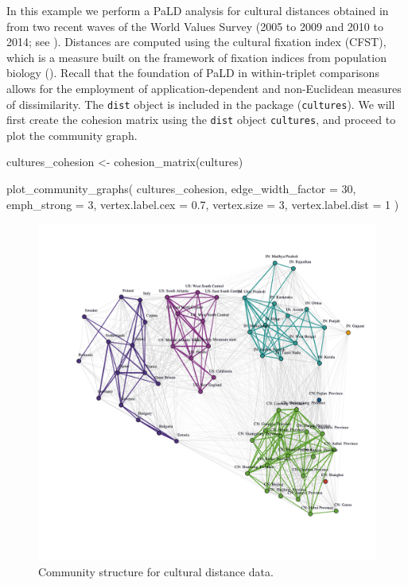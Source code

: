 In this example we perform a PaLD analysis for cultural distances
obtained in \citet{muthukrishna2020beyond} from two recent waves of the
World Values Survey (2005 to 2009 and 2010 to 2014; see
\citet{inglehart2014world}). Distances are computed using the cultural
fixation index (CFST), which is a measure built on the framework of
fixation indices from population biology
(\citet{bell2009culture,cavalli1994history}). Recall that the foundation
of PaLD in within-triplet comparisons allows for the employment of
application-dependent and non-Euclidean measures of dissimilarity. The
\texttt{dist} object is included in the  package
(\texttt{cultures}). We will first create the cohesion matrix using the
\texttt{dist} object \texttt{cultures}, and proceed to plot the
community graph.

\begin{Schunk}
\begin{Sinput}
cultures_cohesion <- cohesion_matrix(cultures)
\end{Sinput}
\end{Schunk}

\begin{Schunk}
\begin{Sinput}
plot_community_graphs(
  cultures_cohesion,
  edge_width_factor = 30,
  emph_strong = 3,
  vertex.label.cex = 0.7,
  vertex.size = 3,
  vertex.label.dist = 1
)
\end{Sinput}
\end{Schunk}

\begin{Schunk}
\begin{figure}
\includegraphics[width=1\linewidth]{fig7} \caption[Community structure for cultural distance data]{Community structure for cultural distance data.}\label{fig:figculture}
\end{figure}
\end{Schunk}

